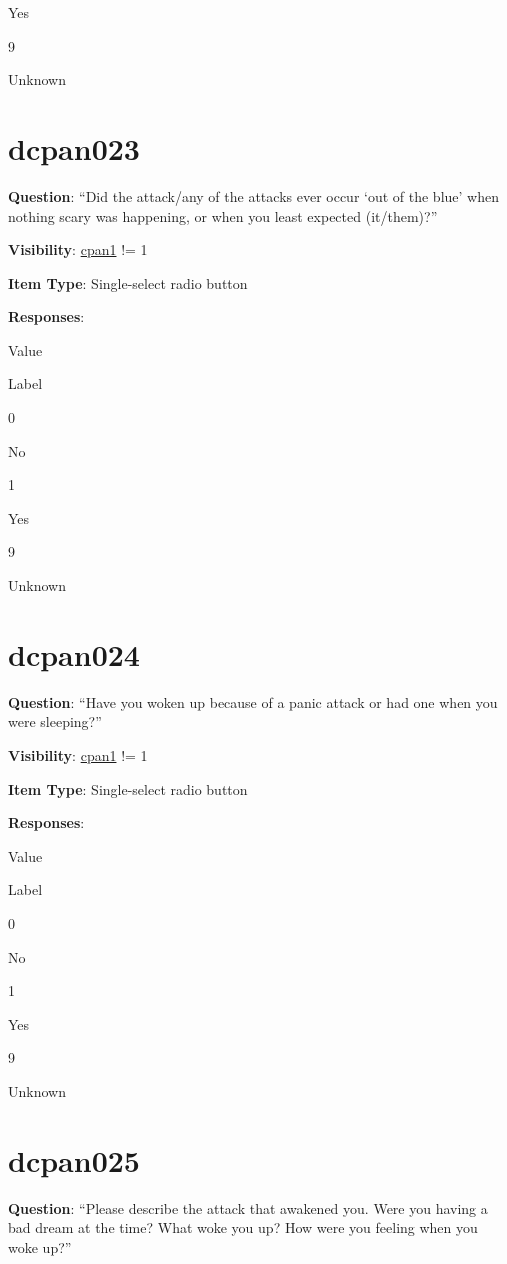 \documentclass[]{book}
\begin{document}
Yes

9

Unknown

\hypertarget{dcpan023}{%
\section{dcpan023}\label{dcpan023}}

\textbf{Question}: ``Did the attack/any of the attacks ever occur `out of the blue' when nothing scary was happening, or when you least expected (it/them)?''

\textbf{Visibility}: \protect\hyperlink{cpan1}{cpan1} != 1

\textbf{Item Type}: Single-select radio button

\textbf{Responses}:

Value

Label

0

No

1

Yes

9

Unknown

\hypertarget{dcpan024}{%
\section{dcpan024}\label{dcpan024}}

\textbf{Question}: ``Have you woken up because of a panic attack or had one when you were sleeping?''

\textbf{Visibility}: \protect\hyperlink{cpan1}{cpan1} != 1

\textbf{Item Type}: Single-select radio button

\textbf{Responses}:

Value

Label

0

No

1

Yes

9

Unknown

\hypertarget{dcpan025}{%
\section{dcpan025}\label{dcpan025}}

\textbf{Question}: ``Please describe the attack that awakened you. Were you having a bad dream at the time? What woke you up? How were you feeling when you woke up?''
\end{document}
